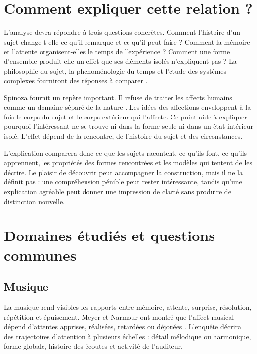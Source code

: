 \documentclass[11pt,a4paper]{article}
\begin{document}
\section{Comment expliquer cette relation ?}

L'analyse devra répondre à trois questions concrètes. Comment l'histoire d'un
sujet change-t-elle ce qu'il remarque et ce qu'il peut faire ? Comment la
mémoire et l'attente organisent-elles le temps de l'expérience ? Comment une
forme d'ensemble produit-elle un effet que ses éléments isolés n'expliquent pas ?
La philosophie du sujet, la phénoménologie du temps et l'étude des systèmes
complexes fourniront des réponses à comparer
\parencite{petitot1993phenomenologie,petitot2002naturaliser}.

Spinoza fournit un repère important. Il refuse de traiter les affects humains
comme un domaine séparé de la nature \parencite{spinoza1966ethique}. Les idées
des affections enveloppent à la fois le corps du sujet et le corps extérieur qui
l'affecte. Ce point aide à expliquer pourquoi l'intéressant ne se trouve ni dans
la forme seule ni dans un état intérieur isolé. L'effet dépend de la rencontre,
de l'histoire du sujet et des circonstances.

L'explication comparera donc ce que les sujets racontent, ce qu'ils font, ce
qu'ils apprennent, les propriétés des formes rencontrées et les modèles qui
tentent de les décrire. Le plaisir de découvrir peut accompagner la
construction, mais il ne la définit pas : une compréhension pénible peut rester
intéressante, tandis qu'une explication agréable peut donner une impression de
clarté sans produire de distinction nouvelle.

\section{Domaines étudiés et questions communes}

\subsection{Musique}

La musique rend visibles les rapports entre mémoire, attente, surprise,
résolution, répétition et épuisement. Meyer et Narmour ont montré que l'affect
musical dépend d'attentes apprises, réalisées, retardées ou déjouées
\parencite{meyer1956emotion,narmour1990basic}. L'enquête décrira des trajectoires
d'attention à plusieurs échelles : détail mélodique ou harmonique, forme globale,
histoire des écoutes et activité de l'auditeur.
\end{document}
